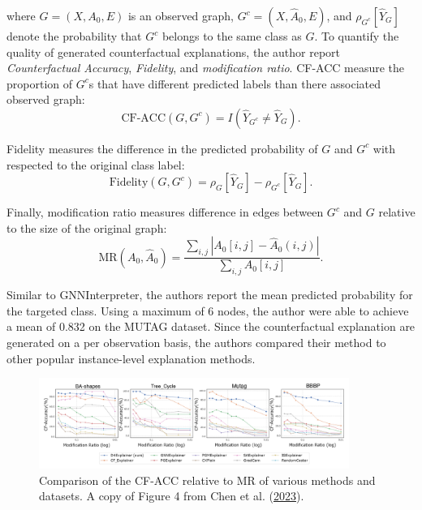 \documentclass[
  11pt,
  letterpaper,
]{article}
\begin{document}
where \(G = (X, A_0, E)\) is an observed graph,
\(G^c = (X, \hat A_0, E)\), and \(\rho_{G^c}[\hat Y_{G}]\) denote the
probability that \(G^c\) belongs to the same class as \(G\). To quantify
the quality of generated counterfactual explanations, the author report
\emph{Counterfactual Accuracy}, \emph{Fidelity}, and \emph{modification
ratio}. CF-ACC measure the proportion of \(G^c\)s that have different
predicted labels than there associated observed graph: \begin{equation}
        \text{CF-ACC}(G, G^c) = I(\hat Y_{G^c} \neq \hat Y_{G}).
\end{equation}

Fidelity measures the difference in the predicted probability of \(G\)
and \(G^c\) with respected to the original class label: \begin{equation}
    \text{Fidelity}(G, G^c) = \rho_{G}[\hat Y_G] - \rho_{G^c}[\hat Y_G].
\end{equation}

Finally, modification ratio measures difference in edges between \(G^c\)
and \(G\) relative to the size of the original graph:
\begin{equation} \label{mod-ratio}
    \text{MR}(A_0, \hat A_0) = \dfrac{\sum_{i, j} |A_0[i, j] - \hat A_0(i, j)|}{\sum_{i, j} A_0[i, j]}. 
\end{equation}

\quad Similar to GNNInterpreter, the authors report the mean predicted
probability for the targeted class. Using a maximum of 6 nodes, the
author were able to achieve a mean of 0.832 on the MUTAG dataset. Since
the counterfactual explanation are generated on a per observation basis,
the authors compared their method to other popular instance-level
explanation methods.

\begin{figure}

{\centering \includegraphics[width=0.9\textwidth,height=\textheight]{figures/D4-CF-Plot.png}

}

\caption{\label{fig-D4-CF-ACC}Comparison of the CF-ACC relative to MR of
various methods and datasets. A copy of Figure 4 from Chen et al.
(\protect\hyperlink{ref-Chen_Wu_Gupta_Ying_2023}{2023}).}

\end{figure}
\end{document}
